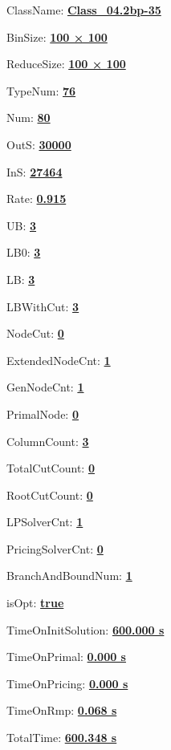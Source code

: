 \documentclass[11pt]{article}
\begin{document}
\pagestyle{empty}


ClassName: \underline{\textbf{Class_04.2bp-35}}
\par
BinSize: \underline{\textbf{100 × 100}}
\par
ReduceSize: \underline{\textbf{100 × 100}}
\par
TypeNum: \underline{\textbf{76}}
\par
Num: \underline{\textbf{80}}
\par
OutS: \underline{\textbf{30000}}
\par
InS: \underline{\textbf{27464}}
\par
Rate: \underline{\textbf{0.915}}
\par
UB: \underline{\textbf{3}}
\par
LB0: \underline{\textbf{3}}
\par
LB: \underline{\textbf{3}}
\par
LBWithCut: \underline{\textbf{3}}
\par
NodeCut: \underline{\textbf{0}}
\par
ExtendedNodeCnt: \underline{\textbf{1}}
\par
GenNodeCnt: \underline{\textbf{1}}
\par
PrimalNode: \underline{\textbf{0}}
\par
ColumnCount: \underline{\textbf{3}}
\par
TotalCutCount: \underline{\textbf{0}}
\par
RootCutCount: \underline{\textbf{0}}
\par
LPSolverCnt: \underline{\textbf{1}}
\par
PricingSolverCnt: \underline{\textbf{0}}
\par
BranchAndBoundNum: \underline{\textbf{1}}
\par
isOpt: \underline{\textbf{true}}
\par
TimeOnInitSolution: \underline{\textbf{600.000 s}}
\par
TimeOnPrimal: \underline{\textbf{0.000 s}}
\par
TimeOnPricing: \underline{\textbf{0.000 s}}
\par
TimeOnRmp: \underline{\textbf{0.068 s}}
\par
TotalTime: \underline{\textbf{600.348 s}}
\par
\newpage
\end{document}
